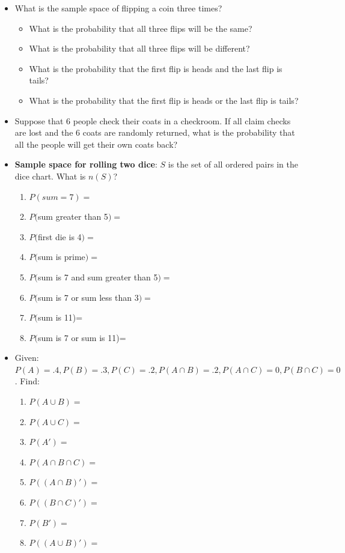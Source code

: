 \documentclass[12pt]{article}
\begin{document}
\begin{itemize}
\item What is the sample space of flipping a coin three times?
\begin{itemize}
	\item What is the probability that all three flips will be the same?
	\item What is the probability that all three flips will be different?
	\item What is the probability that the first flip is heads and the last flip is tails?
	\item What is the probability that the first flip is heads or the last flip is tails? 
\end{itemize}

\item  Suppose that 6 people check their coats in a checkroom. If all claim checks are lost and the 6 coats are randomly returned, what is the probability that all the people will get their own coats back?

\item \textbf{Sample space for rolling two dice}: $S$ is the set of all ordered pairs in the dice chart. What is $n(S)$?
\begin{multicols}{2}
	\begin{enumerate}
		\item $P(sum=7)=$
		\item $P($sum greater than 5$)=$ 
		\item $P($first die is 4$)=$  
		\item $P($sum is prime$)=$ \vfill\null\columnbreak
		\item $P($sum is 7 and sum greater than 5$)=$ 
		\item $P($sum is 7 or sum less than 3$)=$ 
		\item $P($sum is 11)=
		\item $P($sum is 7 or sum is 11)= \vfill\null
	\end{enumerate}
\end{multicols}
\item Given: $P(A)=.4, P(B)=.3, P(C)=.2, P(A\cap B) = .2, P(A\cap C)=0, P(B\cap C)=0$. Find:
\begin{multicols}{2}
	\begin{enumerate}
		\item $P(A\cup B)=$ 
		\item $P(A\cup C)=$ 
		\item $P(A')=$ 
		\item $P(A\cap B \cap C)=$ \vfill\null\columnbreak
		\item $P((A\cap B)')=$ 
		\item $P((B\cap C)')=$ 
		\item $P(B')=$
		\item $P((A\cup B)')=$ \vfill\null
	\end{enumerate}
\end{multicols}


\end{itemize}
\end{document}
